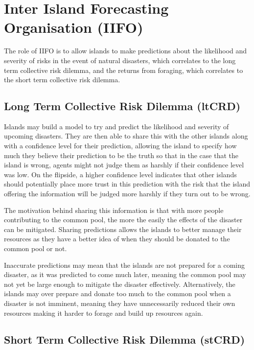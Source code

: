 \chapter{Inter Island Forecasting Organisation (IIFO)}

The role of IIFO is to allow islands to make predictions about the likelihood and severity of risks in the event of natural disasters, which correlates to the long term collective risk dilemma, and the returns from foraging, which correlates to the short term collective risk dilemma.

\section{Long Term Collective Risk Dilemma (ltCRD)}
\label{sec:IIFO:ltCRD}

Islands may build a model to try and predict the likelihood and severity of upcoming disasters. They are then able to share this with the other islands along with a confidence level for their prediction, allowing the island to specify how much they believe their prediction to be the truth so that in the case that the island is wrong, agents might not judge them as harshly if their confidence level was low. On the flipside, a higher confidence level indicates that other islands should potentially place more trust in this prediction with the risk that the island offering the information will be judged more harshly if they turn out to be wrong. 

The motivation behind sharing this information is that with more people contributing to the common pool, the more the easily the effects of the disaster can be mitigated. Sharing predictions allows the islands to better manage their resources as they have a better idea of when they should be donated to the common pool or not.

Inaccurate predictions may mean that the islands are not prepared for a coming disaster, as it was predicted to come much later, meaning the common pool may not yet be large enough to mitigate the disaster effectively. Alternatively, the islands may over prepare and donate too much to the common pool when a disaster is not imminent, meaning they have unnecessarily reduced their own resources making it harder to forage and build up resources again.

\section{Short Term Collective Risk Dilemma (stCRD)}
\label{sec:IIFO:stCRD}

